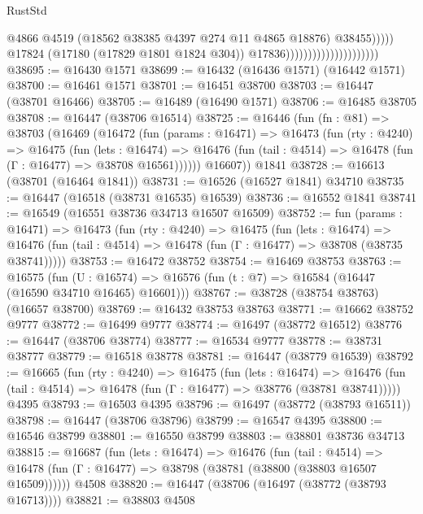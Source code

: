 \begin{lexlean}{RustStd}
\begin{coremodule}
{\begin{coremodule}
{{{{{{{{{{{{{{{{{{{{{{{{{{{{{{{{{{{{{{{{{{{{{{{{{{{{{{{                                                        @4866
                                                        @4519
                                                        (@18562 @38385 @4397 @274 @11 @4865 @18876)
                                                        @38455)))))
                                              @17824
                                              (@17180 (@17829 @1801 @1824 @304))
                                              @17836)))))))))))))))))))))
@38695 := @16430 @1571
@38699 := @16432 (@16436 @1571) (@16442 @1571)
@38700 := @16461 @1571
@38701 := @16451 @38700
@38703 := @16447 (@38701 @16466)
@38705 := @16489 (@16490 @1571)
@38706 := @16485 @38705
@38708 := @16447 (@38706 @16514)
@38725 := @16446
    (fun (fn : @81) =>
    @38703
      (@16469
        (@16472
          (fun (params : @16471) =>
          @16473
            (fun (rty : @4240) =>
            @16475
              (fun (lets : @16474) =>
              @16476 (fun (tail : @4514) => @16478 (fun (Γ : @16477) => @38708 @16561))))))
        @16607))
    @1841
@38728 := @16613 (@38701 (@16464 @1841))
@38731 := @16526 (@16527 @1841) @34710
@38735 := @16447 (@16518 (@38731 @16535) @16539)
@38736 := @16552 @1841
@38741 := @16549 (@16551 @38736 @34713 @16507 @16509)
@38752 := fun (params : @16471) =>
  @16473
    (fun (rty : @4240) =>
    @16475
      (fun (lets : @16474) =>
      @16476 (fun (tail : @4514) => @16478 (fun (Γ : @16477) => @38708 (@38735 @38741)))))
@38753 := @16472 @38752
@38754 := @16469 @38753
@38763 := @16575
    (fun (U : @16574) => @16576 (fun (t : @7) => @16584 (@16447 (@16590 @34710 @16465) @16601)))
@38767 := @38728 (@38754 @38763) (@16657 @38700)
@38769 := @16432 @38753 @38763
@38771 := @16662 @38752 @9777
@38772 := @16499 @9777
@38774 := @16497 (@38772 @16512)
@38776 := @16447 (@38706 @38774)
@38777 := @16534 @9777
@38778 := @38731 @38777
@38779 := @16518 @38778
@38781 := @16447 (@38779 @16539)
@38792 := @16665
    (fun (rty : @4240) =>
    @16475
      (fun (lets : @16474) =>
      @16476 (fun (tail : @4514) => @16478 (fun (Γ : @16477) => @38776 (@38781 @38741)))))
    @4395
@38793 := @16503 @4395
@38796 := @16497 (@38772 (@38793 @16511))
@38798 := @16447 (@38706 @38796)
@38799 := @16547 @4395
@38800 := @16546 @38799
@38801 := @16550 @38799
@38803 := @38801 @38736 @34713
@38815 := @16687
    (fun (lets : @16474) =>
    @16476
      (fun (tail : @4514) =>
      @16478 (fun (Γ : @16477) => @38798 (@38781 (@38800 (@38803 @16507 @16509))))))
    @4508
@38820 := @16447 (@38706 (@16497 (@38772 (@38793 @16713))))
@38821 := @38803 @4508
}}}}}}}}}}}}}}}}}}}}}}}}}}}}}}}}}}}}}}}}}}}}}}}}}}}}}}}
\end{coremodule}}
\end{coremodule}
\end{lexlean}
